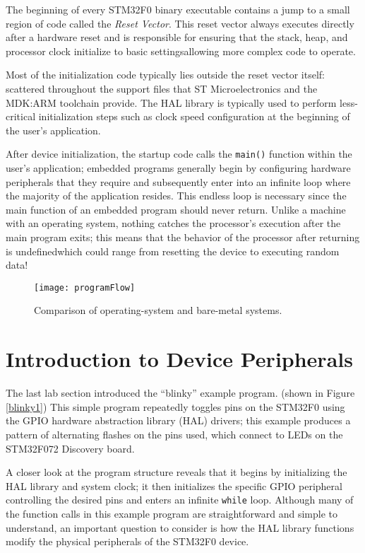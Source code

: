 \documentclass[openany,11pt,fleqn]{book} %
\begin{document}
The beginning of every STM32F0 binary executable contains a jump to a small region of code called the \textit{Reset Vector}. This reset vector always executes directly after a hardware reset and is responsible for ensuring that the stack, heap, and processor clock initialize to basic settings\textemdash allowing more complex code to operate.

Most of the initialization code typically lies outside the reset vector itself: scattered throughout the support files that ST Microelectronics and the MDK:ARM toolchain provide. The HAL library is typically used to perform less-critical initialization steps such as clock speed configuration at the beginning of the user's application. 

After device initialization, the startup code calls the \texttt{main()} function within the user's application; embedded programs generally begin by configuring hardware peripherals that they require and subsequently enter into an infinite loop where the majority of the application resides. This endless loop is necessary since the main function of an embedded program should never return. Unlike a machine with an operating system, nothing catches the processor's execution after the main program exits; this means that the behavior of the processor after returning is undefined\textemdash which could range from resetting the device to executing random data!

\begin{figure}[]
    \centering\texttt{[image: programFlow]}
    \caption{Comparison of operating-system and bare-metal systems. }
    \label{programFlow}
\end{figure}


\section{\color{orange}Introduction to Device Peripherals}

The last lab section introduced the ``blinky'' example program. (shown in Figure \ref{blinky1}) This simple program repeatedly toggles pins on the STM32F0 using the GPIO hardware abstraction library (HAL) drivers; this example produces a pattern of alternating flashes on the pins used, which connect to LEDs on the STM32F072 Discovery board. 

A closer look at the program structure reveals that it begins by initializing the HAL library and system clock; it then initializes the specific GPIO peripheral controlling the desired pins and enters an infinite \texttt{while} loop. Although many of the function calls in this example program are straightforward and simple to understand, an important question to consider is how the HAL library functions modify the physical peripherals of the STM32F0 device.
\end{document}
